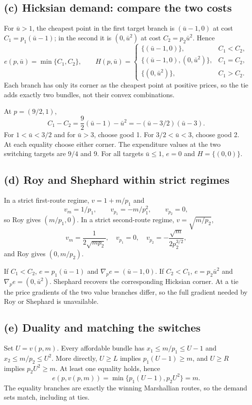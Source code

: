 \documentclass[11pt,a4paper]{article}
\begin{document}
\subsection*{(c) Hicksian demand: compare the two costs}
For $\bar u>1$, the cheapest point in the first target branch is
$(\bar u-1,0)$ at cost $C_1=p_1(\bar u-1)$; in the second it is
$(0,\bar u^2)$ at cost $C_2=p_2\bar u^2$. Hence
\[
 \boxed{e(p,\bar u)=\min\{C_1,C_2\}},\qquad
 \boxed{H(p,\bar u)=
 \begin{cases}
 \{(\bar u-1,0)\},&C_1<C_2,\\
 \{(\bar u-1,0),(0,\bar u^2)\},&C_1=C_2,\\
 \{(0,\bar u^2)\},&C_1>C_2.
 \end{cases}}
\]
Each branch has only its corner as the cheapest point at positive prices,
so the tie adds exactly two bundles, not their convex combinations.

At $p=(9/2,1)$,
\[
 C_1-C_2=\frac92(\bar u-1)-\bar u^2
        =-(\bar u-3/2)(\bar u-3).
\]
For $1<\bar u<3/2$ and for $\bar u>3$, choose good 1. For
$3/2<\bar u<3$, choose good 2. At each equality choose either corner.
The expenditure values at the two switching targets are $9/4$ and 9.
For all targets $\bar u\le1$, $e=0$ and $H=\{(0,0)\}$.

\subsection*{(d) Roy and Shephard within strict regimes}
In a strict first-route regime, $v=1+m/p_1$ and
\[
 v_m=1/p_1,\qquad v_{p_1}=-m/p_1^2,\qquad v_{p_2}=0,
\]
so Roy gives $(m/p_1,0)$. In a strict second-route regime, $v=\sqrt{m/p_2}$,
\[
 v_m=\frac1{2\sqrt{mp_2}},\quad
 v_{p_1}=0,\quad v_{p_2}=-\frac{\sqrt m}{2p_2^{3/2}},
\]
and Roy gives $(0,m/p_2)$.

If $C_1<C_2$, $e=p_1(\bar u-1)$ and
$\nabla_pe=(\bar u-1,0)$. If $C_2<C_1$, $e=p_2\bar u^2$ and
$\nabla_pe=(0,\bar u^2)$. Shephard recovers the corresponding Hicksian
corner. At a tie the price gradients of the two value branches differ,
so the full gradient needed by Roy or Shephard is unavailable.

\subsection*{(e) Duality and matching the switches}
Set $U=v(p,m)$. Every affordable bundle has
$x_1\le m/p_1\le U-1$ and $x_2\le m/p_2\le U^2$.
More directly, $U\ge L$ implies $p_1(U-1)\ge m$, and $U\ge R$ implies
$p_2U^2\ge m$. At least one equality holds, hence
\[
 e(p,v(p,m))=\min\{p_1(U-1),p_2U^2\}=m.
\]
The equality branches are exactly the winning Marshallian routes, so the
demand sets match, including at ties.
\end{document}
